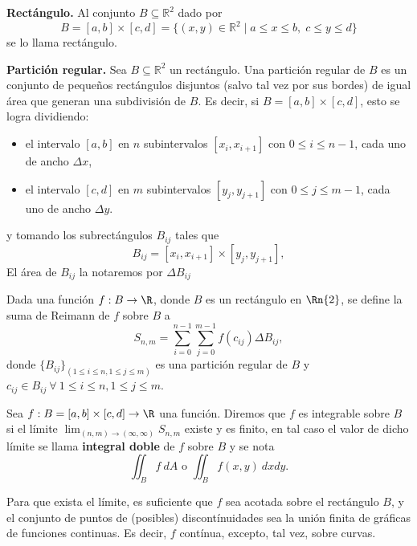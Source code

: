 \begin{definition}  \textbf{Rect\'angulo.} Al conjunto \( B  \subseteq  \mathbb{R}^2 \) dado por
	\[
	B = [a, b] \times [c, d] = \{(x, y) \in \mathbb{R}^2 \mid a \leq x \leq b, \; c \leq y \leq d\}
	\]
	se lo llama rect\'angulo.   
\end{definition}	

\begin{definition} \textbf{Partici\'on regular.} 	Sea \( B  \subseteq  \mathbb{R}^2 \) un rect\'angulo.  Una partición regular de $B$ es un conjunto de pequeños rectángulos disjuntos (salvo tal vez por sus bordes)  de igual \'area que  generan una subdivisi\'on de $B$.  Es decir, si $B = [a, b] \times [c, d]$,  esto se logra dividiendo:
	
	\begin{itemize}
		\item el intervalo \( [a, b] \) en \( n \) subintervalos \( [x_i, x_{i+1}] \) con $0 \leq  i \leq n-1$, cada uno de ancho \( \Delta x \),
		\item el intervalo \( [c, d] \) en \( m \) subintervalos \( [y_j, y_{j+1}] \) con $0 \leq  j \leq m-1$, cada uno de ancho \( \Delta y \).
	\end{itemize}
y tomando los subrect\'angulos $B_{ij}$ tales que
	\[
	B_{ij} = [x_i, x_{i+1}] \times [y_j, y_{j+1}], 
	\]  El \'area de $ B_{ij}$ la notaremos por $\Delta B_{ij}$ 
\end{definition}


\begin{definition}
Dada una funci\'on $f:B\to\R$, donde $B$ es un rect\'angulo en $\Rn{2}$, se define la suma de Reimann de $f$ sobre $B$ a 
\[
    S_{n,m}=\sum_{i=0}^{n-1}\sum_{j=0}^{m-1} f(c_{ij})\Delta B_{ij},
\]  
donde $\{ B_{ij}\}_{( 1 \leq i \leq n, 1 \leq j \leq m )}$ es una partici\'on regular de $B$ y  $c_{ij}\in B_{ij} \: \forall \: 1 \leq i \leq n, 1 \leq j \leq m$. 
\end{definition}

\begin{definition} 
    Sea $f:B=[a,b]\times[c,d]\to\R$ una funci\'on. Diremos que $f$ es integrable sobre $B$ si  el l\'imite $\lim_{(n,m)\to (\infty,\infty)}S_{n,m}$  existe y es finito, en tal caso el valor de dicho  l\'imite  se llama \textbf{integral doble} de $f$ sobre $B$ y se nota 
    \[
          \iint_B f\:dA  \mbox{ o } \iint_B f(x,y)\:dxdy.
    \]
\end{definition}

\begin{obs}
Para que exista el límite,  es suficiente que $f$ sea acotada sobre el rectángulo $B$, y el conjunto de puntos de (posibles) discontínuidades  sea la unión finita de gráficas
de funciones continuas. Es decir, $f$ contínua, excepto, tal vez, sobre curvas.
\end{obs}



